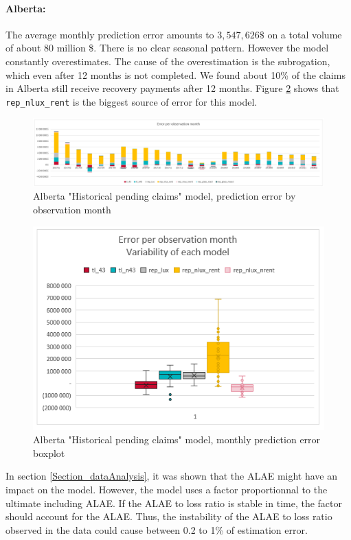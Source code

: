 	\paragraph{Alberta:}
		The average monthly prediction error amounts to $3,547,626\$ $ on a total volume of about 80 million \$. There is no clear seasonal pattern. However the model constantly overestimates. The cause of the overestimation is the subrogation, which even after 12 months is not completed. We found about 10\% of the claims in Alberta still receive recovery payments after 12 months. Figure \ref{Fig_AB_current_er_boxplot} shows that \texttt{rep\_nlux\_rent} is the biggest source of error for this model.   
		\begin{figure}[H]
			\begin{center}
				\includegraphics[scale=0.4]{Graphiques/AB_current_model_by_month} 
				\renewcommand{\figurename}{Figure}
				\caption[Alberta version one model error]{Alberta "Historical pending claims" model, prediction error by observation month}\label{Fig_AB_current_er_by_month}
			\end{center}
		\end{figure}
		\begin{figure}[H]
			\begin{center}
				\includegraphics[scale=0.4]{Graphiques/AB_current_model_mustach} 
				\renewcommand{\figurename}{Figure}
				\caption[Alberta version one model error - boxplot]{Alberta "Historical pending claims" model, monthly prediction error boxplot}\label{Fig_AB_current_er_boxplot}
			\end{center}
		\end{figure}
	In section \ref{Section_dataAnalysis}, it was shown that the ALAE might have an impact on the model. However, the model uses a factor proportionnal to the ultimate including ALAE. If the ALAE to loss ratio is stable in time, the factor should account for the ALAE. Thus, the instability of the ALAE to loss ratio observed in the data could cause between 0.2 to 1\% of estimation error.
		
